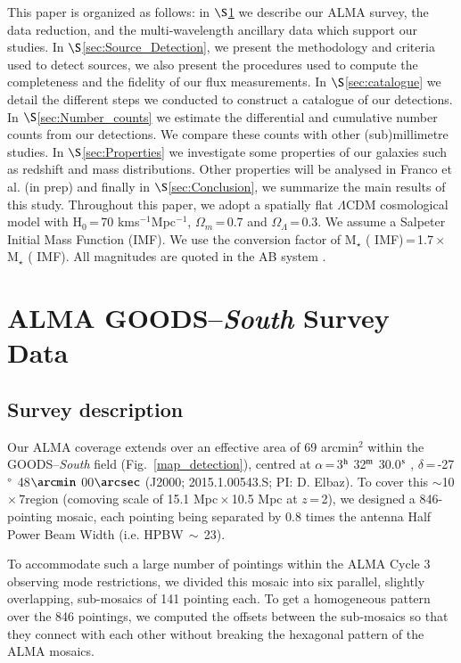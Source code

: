 \documentclass[longauth]{aa}
\begin{document}
This paper is organized as follows: in $\S$\ref{sec:Survey_data} we describe our ALMA survey, the data reduction, and the multi-wavelength ancillary data which support our studies. In $\S$\ref{sec:Source_Detection}, we present the methodology and criteria used to detect sources, we also present the procedures used to compute the completeness and the fidelity of our flux measurements. In $\S$\ref{sec:catalogue} we detail the different steps we conducted to construct a catalogue  of our detections.  In $\S$\ref{sec:Number_counts} we estimate the differential and cumulative number counts from our detections. We compare these counts with other (sub)millimetre studies. In  $\S$\ref{sec:Properties} we investigate some properties of our galaxies such as redshift and mass distributions. Other properties will be analysed in Franco et al. (in prep) and finally in $\S$\ref{sec:Conclusion}, we summarize the main results of this study.  Throughout this paper, we adopt a spatially flat $\Lambda$CDM cosmological model with H$_0$\,=\,70 kms$^{-1}$Mpc$^{-1}$, $\Omega_m$\,=\,0.7 and $\Omega_{\Lambda}$\,=\,0.3. We assume a Salpeter \citep{Salpeter1955} Initial Mass Function (IMF). We use the conversion factor of M$_\star$ (\citealt{Salpeter1955} IMF)\,=\,1.7\,$\times$\,M$_\star$ (\citealt{Chabrier2003} IMF). All magnitudes are quoted in the AB system \citep{Oke1983}.

\section{ALMA GOODS--\textit{South} Survey Data}\label{sec:Survey_data}
\subsection{Survey description}
Our ALMA coverage extends over an effective area of 69 arcmin$^2$ within the GOODS--\textit{South} field (Fig.~\ref{map_detection}), centred at $\alpha$\,=\,3$^{\rm h}$ 32$^{\rm m}$ 30.0$^{\rm s}$ , $\delta$\,=\,-27$\degree$ 48$\arcmin$ 00$\arcsec$ (J2000; 2015.1.00543.S; PI: D. Elbaz).
To cover this $\sim$10\arcmin\,$\times$\,7\arcmin  region (comoving scale of 15.1 Mpc\,$\times$\,10.5 Mpc at $z$\,=\,2),  we designed a 846-pointing mosaic, each pointing being separated by $0.8$ times the antenna Half Power Beam Width (i.e. HPBW$\,\sim\,$23).

To accommodate such a large number of pointings within the ALMA Cycle 3 observing mode restrictions, we divided this mosaic into six parallel, slightly overlapping, sub-mosaics of 141 pointing each. To get a homogeneous pattern over the 846 pointings, we computed the offsets between the sub-mosaics so that they connect with each other without breaking the hexagonal pattern of the ALMA mosaics.
\end{document}
